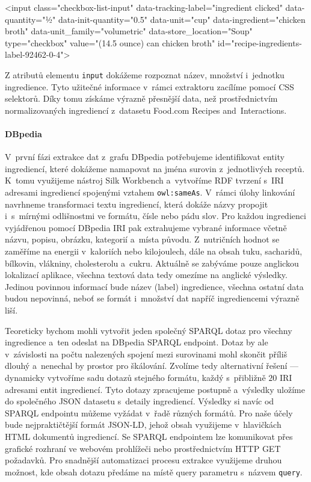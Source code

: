 \begin{code}
<input
    class="checkbox-list-input"
    data-tracking-label="ingredient clicked"
    data-quantity="½"
    data-init-quantity="0.5"
    data-unit="cup"
    data-ingredient="chicken broth"
    data-unit_family="volumetric"
    data-store_location="Soup"
    type="checkbox"
    value="(14.5 ounce) can chicken broth"
    id="recipe-ingredients-label-92462-0-4">
\end{code}

Z atributů elementu \texttt{input} dokážeme rozpoznat název, množství i~jednotku ingredience. Tyto užitečné informace v~rámci extraktoru zacílíme pomocí CSS selektorů. Díky tomu získáme výrazně přesnější data, než prostřednictvím normalizovaných ingrediencí z~datasetu Food.com Recipes and~Interactions.

\paragraph{DBpedia}

V~první fázi extrakce dat z~grafu DBpedia potřebujeme identifikovat entity ingrediencí, které dokážeme namapovat na jména surovin z~jednotlivých receptů. K~tomu využijeme nástroj Silk Workbench a~vytvoříme RDF tvrzení s~IRI adresami ingrediencí spojenými vztahem \texttt{owl:sameAs}. V~rámci úlohy linkování navrhneme transformaci textu ingrediencí, která dokáže názvy propojit i~s~mírnými odlišnostmi ve formátu, čísle nebo pádu slov. Pro každou ingredienci vyjádřenou pomocí DBpedia IRI pak extrahujeme vybrané informace včetně názvu, popisu, obrázku, kategorií a~místa původu. Z~nutričních hodnot se zaměříme na energii v~kaloriích nebo kilojoulech, dále na obsah tuku, sacharidů, bílkovin, vlákniny, cholesterolu a~cukru. Aktuálně se zabýváme pouze anglickou lokalizací aplikace, všechna textová data tedy omezíme na anglické výsledky. Jedinou povinnou informací bude název (label) ingredience, všechna ostatní data budou nepovinná, neboť se formát i~množství dat napříč ingrediencemi výrazně liší.

Teoreticky bychom mohli vytvořit jeden společný SPARQL dotaz pro všechny ingredience a~ten odeslat na DBpedia SPARQL endpoint. Dotaz by ale v~závislosti na počtu nalezených spojení mezi surovinami mohl skončit příliš dlouhý a~nenechal by prostor pro škálování. Zvolíme tedy alternativní řešení --- dynamicky vytvoříme sadu dotazů stejného formátu, každý s~přibližně $20$ IRI adresami entit ingrediencí. Tyto dotazy zpracujeme postupně a~výsledky uložíme do společného JSON datasetu s~detaily ingrediencí. Výsledky si navíc od SPARQL endpointu můžeme vyžádat v~řadě různých formátů. Pro naše účely bude nejpraktičtější formát JSON-LD, jehož obsah využijeme v~hlavičkách HTML dokumentů ingrediencí. Se SPARQL endpointem lze komunikovat přes grafické rozhraní ve webovém prohlížeči nebo prostřednictvím HTTP GET požadavků. Pro snadnější automatizaci procesu extrakce využijeme druhou možnost, kde obsah dotazu předáme na místě query parametru s~názvem \texttt{query}.

